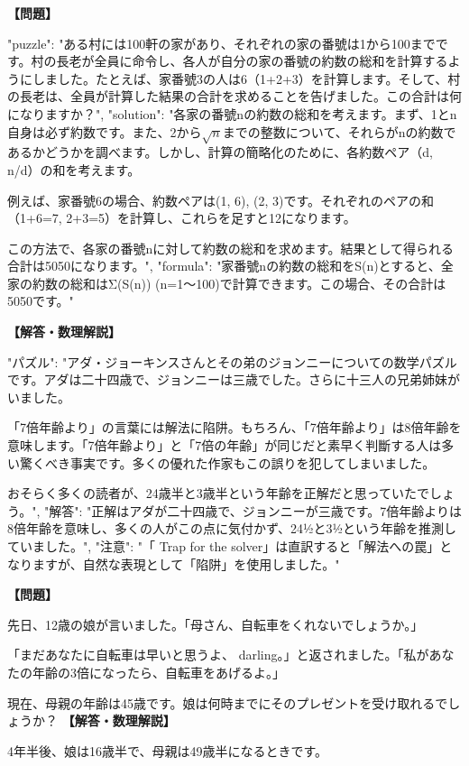\documentclass[10pt,a4paper,oneside,openany]{ltjsbook}
\begin{document}
\begin{tcolorbox}[colback=softblue,colframe=primaryblue,title=\textbf{第 44 問：A CENSUS PUZZLE.},arc=2mm,boxrule=1pt,breakable]
\textbf{【問題】}\par\vspace{0.3em}
{
  "puzzle": "ある村には100軒の家があり、それぞれの家の番號は1から100までです。村の長老が全員に命令し、各人が自分の家の番號の約数の総和を計算するようにしました。たとえば、家番號3の人は6（1+2+3）を計算します。そして、村の長老は、全員が計算した結果の合計を求めることを告げました。この合計は何になりますか？",
  "solution": "各家の番號nの約数の総和を考えます。まず、1とn自身は必ず約数です。また、2から\(\sqrt{n}\)までの整数について、それらがnの約数であるかどうかを調べます。しかし、計算の簡略化のために、各約数ペア（d, n/d）の和を考えます。

例えば、家番號6の場合、約数ペアは(1, 6), (2, 3)です。それぞれのペアの和（1+6=7, 2+3=5）を計算し、これらを足すと12になります。

この方法で、各家の番號nに対して約数の総和を求めます。結果として得られる合計は5050になります。",
  "formula": "家番號nの約数の総和をS(n)とすると、全家の約数の総和はΣ(S(n)) (n=1〜100)で計算できます。この場合、その合計は5050です。"
}
\tcblower
\textbf{【解答・数理解説】}\par\vspace{0.3em}
{
"パズル": "アダ・ジョーキンスさんとその弟のジョンニーについての数学パズルです。アダは二十四歳で、ジョンニーは三歳でした。さらに十三人の兄弟姉妹がいました。

「7倍年齢より」の言葉には解法に陷阱。もちろん、「7倍年齢より」は8倍年齢を意味します。「7倍年齢より」と「7倍の年齢」が同じだと素早く判斷する人は多い驚くべき事実です。多くの優れた作家もこの誤りを犯してしまいました。

おそらく多くの読者が、24歳半と3歳半という年齢を正解だと思っていたでしょう。",
"解答": "正解はアダが二十四歳で、ジョンニーが三歳です。7倍年齢よりは8倍年齢を意味し、多くの人がこの点に気付かず、24½と3½という年齢を推測していました。",
"注意": "「 Trap for the solver」は直訳すると「解法への罠」となりますが、自然な表現として「陷阱」を使用しました。"
}
\end{tcolorbox}

\begin{tcolorbox}[colback=softblue,colframe=primaryblue,title=\textbf{第 45 問：母と娘 （原題: MOTHER AND DAUGHTER.）},arc=2mm,boxrule=1pt,breakable]
\textbf{【問題】}\par\vspace{0.3em}
先日、12歳の娘が言いました。「母さん、自転車をくれないでしょうか。」

「まだあなたに自転車は早いと思うよ、 darling。」と返されました。「私があなたの年齢の3倍になったら、自転車をあげるよ。」

現在、母親の年齢は45歳です。娘は何時までにそのプレゼントを受け取れるでしょうか？
\tcblower
\textbf{【解答・数理解説】}\par\vspace{0.3em}
4年半後、娘は16歳半で、母親は49歳半になるときです。
\end{tcolorbox}
\end{document}

